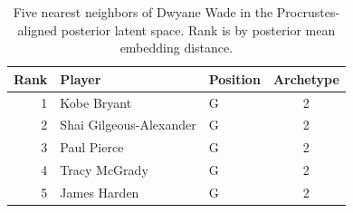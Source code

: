 \begin{table}[htbp]
  \centering\small
  \begin{tabular}{rllc}
    \toprule
    Rank & Player & Position & Archetype \\
    \midrule
    1 & Kobe Bryant & G & 2 \\
    2 & Shai Gilgeous-Alexander & G & 2 \\
    3 & Paul Pierce & G & 2 \\
    4 & Tracy McGrady & G & 2 \\
    5 & James Harden & G & 2 \\
    \bottomrule
  \end{tabular}
  \caption{Five nearest neighbors of Dwyane Wade in the Procrustes-aligned posterior latent space. Rank is by posterior mean embedding distance.}
  \label{tab:Dwyane_Wade_neighbors}
\end{table}

